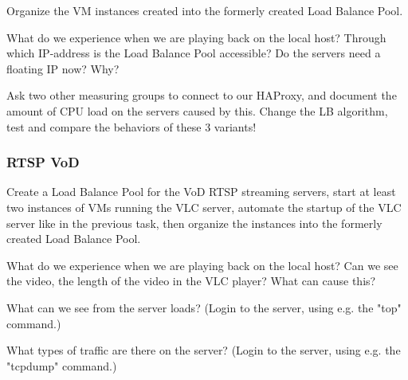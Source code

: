 \documentclass[a4paper]{article}
\begin{document}
Organize the VM instances created into the formerly created Load Balance Pool. 

\noindent{}What do we experience when we are playing back on the local host? Through which IP-address is the Load Balance Pool accessible? Do the servers need a floating IP now? Why?

\noindent{}Ask two other measuring groups to connect to our HAProxy, and document the amount of CPU load on the servers caused by this.
Change the LB algorithm, test and compare the behaviors of these 3 variants!

\subsubsection{RTSP VoD}

Create a Load Balance Pool for the VoD RTSP streaming servers, start at least two instances of VMs running the VLC server, automate the startup of the VLC server like in the previous task, then organize the instances into the formerly created Load Balance Pool.

\noindent{}What do we experience when we are playing back on the local host? Can we see the video, the length of the video in the VLC player? What can cause this?

\noindent{}What can we see from the server loads? (Login to the server, using e.g. the "top" command.)

\noindent{}What types of traffic are there on the server? (Login to the server, using e.g. the "tcpdump" command.)
\end{document}
